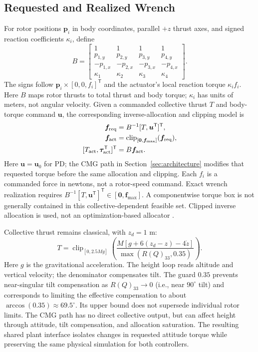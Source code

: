 \documentclass[letterpaper, 10 pt, conference]{ieeeconf}
\newcommand{\T}{^{\mathsf T}}
\newcommand{\clip}{\operatorname{clip}}
\begin{document}
\subsection{Requested and Realized Wrench}
For rotor positions $\bm p_i$ in body coordinates, parallel $+z$ thrust
axes, and signed reaction coefficients $\kappa_i$, define
\begin{equation}
 B=\begin{bmatrix}
 1&1&1&1\\p_{1,y}&p_{2,y}&p_{3,y}&p_{4,y}\\
 -p_{1,x}&-p_{2,x}&-p_{3,x}&-p_{4,x}\\
 \kappa_1&\kappa_2&\kappa_3&\kappa_4
 \end{bmatrix}.
 \label{eq:allocationmatrix}
\end{equation}
The signs follow $\bm p_i\times[0,0,f_i]\T$ and the actuator's local reaction torque $\kappa_i f_i$. Here $B$ maps rotor thrusts to total thrust and body torque; $\kappa_i$ has units of meters, not angular velocity. Given a commanded collective thrust $T$ and body-torque command $\bm u$, the corresponding inverse-allocation and clipping model is
\begin{equation}
 \begin{aligned}
 \bm f_{\rm req}&=B^{-1}[T,\bm u\T]\T,\\
 \bm f_{\rm act}&=\clip_{[\bm0,\bm f_{\max}]}(\bm f_{\rm req}),\\
 [T_{\rm act},\bm\tau_{\rm act}\T]\T&=B\bm f_{\rm act}.
 \end{aligned}
 \label{eq:mixer}
\end{equation}
Here $\bm u=\bm u_0$ for PD; the CMG path in Section~\ref{sec:architecture}
modifies that requested torque before the same allocation and clipping.
Each $f_i$ is a commanded force in newtons, not a rotor-speed command.
Exact wrench realization requires
$B^{-1}[T,\bm u\T]\T\in[\bm0,\bm f_{\max}]$.
A componentwise torque box is not generally contained in this
collective-dependent feasible set. Clipped inverse allocation is used,
not an optimization-based allocator \cite{monteiro2016allocation}.

Collective thrust remains classical, with $z_d=1$ m:
\begin{equation}
 T=\clip_{[0,2.5Mg]}
 \left(\frac{M[g+6(z_d-z)-4\dot z]}{\max(R(Q)_{33},0.35)}\right).
 \label{eq:collective}
\end{equation}
Here $g$ is the gravitational acceleration. The height loop reads altitude and vertical velocity; the denominator compensates tilt.
The guard $0.35$ prevents near-singular tilt compensation as $R(Q)_{33}\to0$
(i.e., near $90^\circ$ tilt) and corresponds to limiting the effective
compensation to about $\arccos(0.35)\approx69.5^\circ$. Its upper bound does
not supersede individual rotor limits. The CMG path has no direct collective
output, but can affect height through attitude, tilt compensation, and
allocation saturation.
The resulting shared plant interface isolates changes in requested
attitude torque while preserving the same physical simulation for both
controllers.
\end{document}
